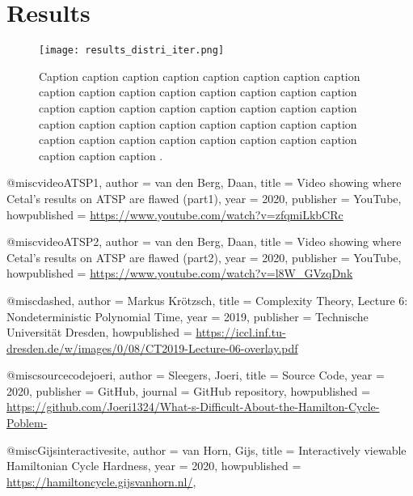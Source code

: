 \section{Results}
\begin{figure*}[htbp]
\centering%
\texttt{[image: results\_distri\_iter.png]} 
\caption{Caption caption caption caption caption caption caption caption caption caption caption caption caption caption caption caption caption caption caption caption caption caption caption caption caption caption caption caption caption caption caption caption caption caption caption caption caption caption caption caption caption caption caption .}\label{figpham}
\end{figure*}



@misc{videoATSP1,
  author = {van den Berg, Daan},
  title = {Video showing where Cetal's results on ATSP are flawed (part1)},
  year = {2020},
  publisher = {YouTube},
  howpublished = {\url{https://www.youtube.com/watch?v=zfqmiLkbCRc}}
}


@misc{videoATSP2,
  author = {van den Berg, Daan},
  title = {Video showing where Cetal's results on ATSP are flawed (part2)},
  year = {2020},
  publisher = {YouTube},
  howpublished = {\url{https://www.youtube.com/watch?v=l8W_GVzqDnk}}
}


@misc{dashed,
  author = {Markus Kr{\"o}tzsch},
  title = {Complexity Theory, Lecture 6: Nondeterministic Polynomial Time},
  year = {2019},
  publisher = {Technische Universit{\"a}t Dresden},
  howpublished = {\url{https://iccl.inf.tu-dresden.de/w/images/0/08/CT2019-Lecture-06-overlay.pdf}}
}

@misc{sourcecodejoeri,
  author = {Sleegers, Joeri},
  title = {Source Code},
  year = {2020},
  publisher = {GitHub},
  journal = {GitHub repository},
  howpublished = {\url{https://github.com/Joeri1324/What-s-Difficult-About-the-Hamilton-Cycle-Poblem-}}
}

@misc{Gijsinteractivesite,
  author = {van Horn, Gijs},
  title = {Interactively viewable Hamiltonian Cycle Hardness},
  year = {2020},
  howpublished = {\url{https://hamiltoncycle.gijsvanhorn.nl/}},
}
